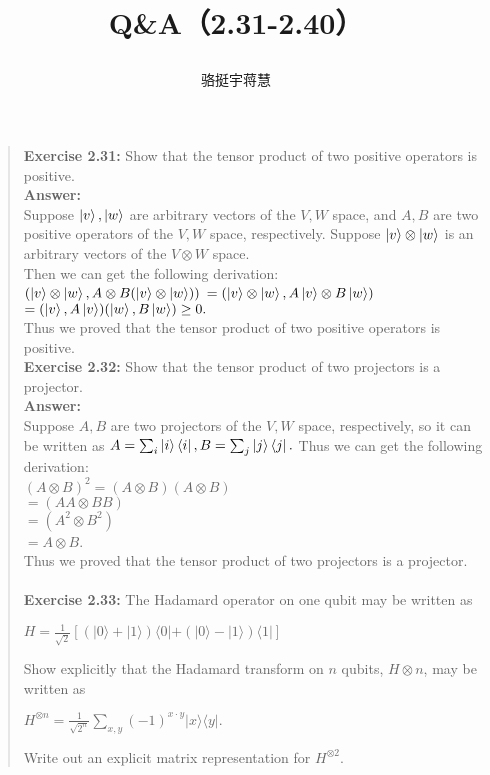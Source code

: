 \documentclass[UTF8]{ctexart}
\begin{document}
	\title{\textbf{Q\&A（2.31-2.40）}\\[1ex]\begin{large}
		\end{large}}
	\author{骆挺宇\quad 蒋慧}
	\maketitle
\begin{quote}
\textbf{Exercise 2.31: } Show that the tensor product of two positive operators is positive.
\\
\textbf{Answer:}\\
Suppose $\ket{v}, \ket{w}$ are arbitrary vectors of  the $V, W$ space, and $A, B$ are  two positive operators of  the $V, W$ space, respectively. Suppose  $\ket{v} \otimes \ket{w}$ is an arbitrary vectors of the $V \otimes W$ space.
\\
Then we can get the following derivation: \\
$(\ket{v} \otimes \ket{w}, A \otimes B (\ket{v} \otimes \ket{w}))$
$=(\ket{v} \otimes \ket{w}, A\ket{v} \otimes B\ket{w})$ 
$=(\ket{v} , A\ket{v})( \ket{w}, B\ket{w}) \geq 0.$
\\
Thus we proved that the tensor product of two positive operators is positive.
\\

\textbf{Exercise 2.32:  } Show that the tensor product of two projectors is a projector.
	\\ 
\textbf{Answer:}\\
	 Suppose $A, B$ are  two projectors of  the $V, W$ space, respectively, so it can be written as $A= \sum_{i} \ket{i} \bra{i}, B= \sum_{j} \ket{j} \bra{j}. $
	Thus we can get the following derivation: \\
	$(A\otimes B)^{2}=(A\otimes B)(A\otimes B)$\\
	 \hspace*{1.58cm}$=(AA\otimes BB)$\\
	 \hspace*{1.58cm}$=(A^{2}\otimes B^{2})$ \\
	 \hspace*{1.58cm}$=A \otimes B$.
	\\
	Thus we proved that the tensor product of two projectors is a projector.
	\\  \\
\textbf{Exercise 2.33:} The Hadamard operator on one qubit may be written as 
\begin{center}
$H=\frac{1}{\sqrt{2}}[(|0\rangle+|1\rangle)\langle 0|+(|0\rangle-|1\rangle)\langle 1|]$\\
\end{center}
Show explicitly that the Hadamard transform on $n$ qubits, $H\otimes n$, may be written as
 \begin{center}
$ H^{\otimes n}=\frac{1}{\sqrt{2^{n}}} \sum_{x, y}(-1)^{x \cdot y}|x\rangle\langle y|.$
 \end{center}
 Write out an explicit matrix representation for $H^{\otimes 2}$.\\
 

\end{quote}
\end{document}
